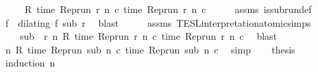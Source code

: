 \begin{isabellebody}
\ \ \ \ \ {\isacartoucheopen}R\ {\isacharparenleft}time\ {\isacharparenleft}{\isacharparenleft}Rep{\isacharunderscore}run\ r{\isacharparenright}\ n\ c\ time\ {\isacharparenleft}{\isacharparenleft}Rep{\isacharunderscore}run\ r{\isacharparenright}\ n\ c\isanewline
%
\isadelimproof
%
\endisadelimproof
%
\isatagproof
{}\isamarkupfalse%
\ {\isacharminus}\isanewline
\ \ \isamarkupfalse%
\ assms{\isacharparenleft}{}{\isacharparenright}\ is{\isacharunderscore}subrun{\isacharunderscore}def\ \isamarkupfalse%
\ f\ \ {\isacharasterisk}{\isacharcolon}{\isacartoucheopen}dilating\ f\ sub\ r{\isacartoucheclose}\ \isamarkupfalse%
\ blast\isanewline
\ \ \isamarkupfalse%
\ \isamarkupfalse%
\ assms{\isacharparenleft}{}{\isacharparenright}\ TESL{\isacharunderscore}interpretation{\isacharunderscore}atomic{\isachardot}simps{\isacharparenleft}{}{\isacharparenright}\ \isamarkupfalse%
\isanewline
\ \ \ \ {\isacartoucheopen}sub\ {\isasymin}\ {\isacharbraceleft}r{\isachardot}\ {\isasymforall}n{\isachardot}\ R\ {\isacharparenleft}time\ {\isacharparenleft}{\isacharparenleft}Rep{\isacharunderscore}run\ r{\isacharparenright}\ n\ c\ time\ {\isacharparenleft}{\isacharparenleft}Rep{\isacharunderscore}run\ r{\isacharparenright}\ n\ c\ \isamarkupfalse%
\ blast\isanewline
\ \ \isamarkupfalse%
\ {}{\isacharcolon}{\isacartoucheopen}{\isasymforall}n{\isachardot}\ R\ {\isacharparenleft}time\ {\isacharparenleft}{\isacharparenleft}Rep{\isacharunderscore}run\ sub{\isacharparenright}\ n\ c\ time\ {\isacharparenleft}{\isacharparenleft}Rep{\isacharunderscore}run\ sub{\isacharparenright}\ n\ c\ \isamarkupfalse%
\ simp\isanewline
\ \ \isamarkupfalse%
\ {\isacharquery}thesis\isanewline
\ \ \isamarkupfalse%
\ {\isacharparenleft}induction\ n{\isacharparenright}\isanewline
\ \ \ \ \isamarkupfalse%
\ {}\isanewline
\ \ \ \ \ \ \isamarkupfalse%

\end{isabellebody}
